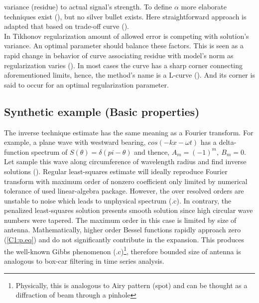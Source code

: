 variance (residue) to actual signal's strength. To define $\alpha$ more elaborate techniques exist 
(\cite{williams2001regularization}), but no silver bullet exists. Here straightforward 
approach is adapted that based on trade-off curve (\cite{hansen1993use}).\\
In Tikhonov regularization amount of allowed error is competing with solution's variance. An 
optimal parameter should balance these factors. This is seen as a rapid change in behavior of curve 
associating residue with model's norm as regularization varies (). In most 
cases the curve has a sharp corner connecting aforementioned limits, hence, the method's name is a 
L-curve (\cite{hansen1999curve}). And its corner is said to occur for an optimal regularization 
parameter.

\subsection{Synthetic example (Basic properties)}
The inverse technique estimate has the same meaning as a Fourier transform. For 
example, a plane wave with westward bearing, $cos(-kx - \omega t)$ has a delta-function spectrum  
of $S(\theta) = \delta(pi - \theta)$ and thence, $A_m = (-1)^m,~B_m = 0$. Let sample this wave 
along circumference of wavelength radius and find inverse solutions (). Regular 
least-squares estimate will ideally reproduce Fourier transform with maximum order of nonzero 
coefficient only limited by numerical tolerance of used linear-algebra package. However, the over 
resolved orders are unstable to noise which leads to unphysical spectrum (.c). In 
contrary, the penalized least-squares solution presents smooth solution since high circular wave 
numbers were tapered. The maximum order in this case is limited by size of antenna. Mathematically, 
higher order Bessel functions rapidly approach zero (\eqref{C1:p.eq}) and do not significantly 
contribute in the expansion. This produces the well-known Gibbs phenomenon 
(.c)\footnote{Physically, this is analogous to Airy pattern (spot) and can be 
thought as a diffraction of beam through a pinhole}, 
therefore bounded size of antenna is analogous to box-car filtering in time series analysis.\\

